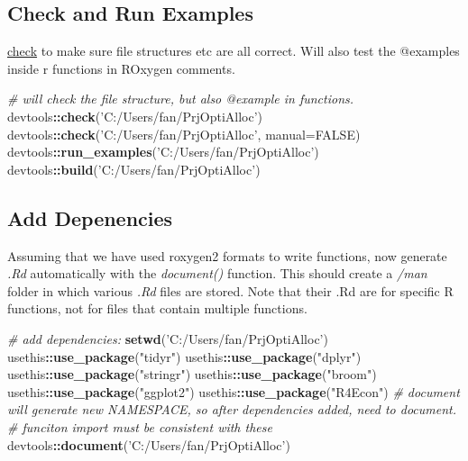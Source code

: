 \documentclass[
]{article}
\newenvironment{Shaded}{\begin{snugshade}}{\end{snugshade}}
\newcommand{\CommentTok}[1]{\textcolor[rgb]{0.56,0.35,0.01}{\textit{#1}}}
\newcommand{\DataTypeTok}[1]{\textcolor[rgb]{0.13,0.29,0.53}{#1}}
\newcommand{\KeywordTok}[1]{\textcolor[rgb]{0.13,0.29,0.53}{\textbf{#1}}}
\newcommand{\NormalTok}[1]{#1}
\newcommand{\OperatorTok}[1]{\textcolor[rgb]{0.81,0.36,0.00}{\textbf{#1}}}
\newcommand{\OtherTok}[1]{\textcolor[rgb]{0.56,0.35,0.01}{#1}}
\newcommand{\StringTok}[1]{\textcolor[rgb]{0.31,0.60,0.02}{#1}}
\begin{document}
\hypertarget{check-and-run-examples}{%
\subsection{Check and Run Examples}\label{check-and-run-examples}}

\href{http://r-pkgs.had.co.nz/check.html}{check} to make sure file
structures etc are all correct. Will also test the @examples inside r
functions in ROxygen comments.

\begin{Shaded}
\begin{Highlighting}[]
\CommentTok{# will check the file structure, but also @example in functions.}
\NormalTok{devtools}\OperatorTok{::}\KeywordTok{check}\NormalTok{(}\StringTok{'C:/Users/fan/PrjOptiAlloc'}\NormalTok{)}
\NormalTok{devtools}\OperatorTok{::}\KeywordTok{check}\NormalTok{(}\StringTok{'C:/Users/fan/PrjOptiAlloc'}\NormalTok{, }\DataTypeTok{manual=}\OtherTok{FALSE}\NormalTok{)}
\NormalTok{devtools}\OperatorTok{::}\KeywordTok{run_examples}\NormalTok{(}\StringTok{'C:/Users/fan/PrjOptiAlloc'}\NormalTok{)}
\NormalTok{devtools}\OperatorTok{::}\KeywordTok{build}\NormalTok{(}\StringTok{'C:/Users/fan/PrjOptiAlloc'}\NormalTok{)}
\end{Highlighting}
\end{Shaded}

\hypertarget{add-depenencies}{%
\subsection{Add Depenencies}\label{add-depenencies}}

Assuming that we have used roxygen2 formats to write functions, now
generate \emph{.Rd} automatically with the \emph{document()} function.
This should create a \emph{/man} folder in which various \emph{.Rd}
files are stored. Note that their .Rd are for specific R functions, not
for files that contain multiple functions.

\begin{Shaded}
\begin{Highlighting}[]
\CommentTok{# add dependencies:}
\KeywordTok{setwd}\NormalTok{(}\StringTok{'C:/Users/fan/PrjOptiAlloc'}\NormalTok{)}
\NormalTok{usethis}\OperatorTok{::}\KeywordTok{use_package}\NormalTok{(}\StringTok{"tidyr"}\NormalTok{)}
\NormalTok{usethis}\OperatorTok{::}\KeywordTok{use_package}\NormalTok{(}\StringTok{"dplyr"}\NormalTok{)}
\NormalTok{usethis}\OperatorTok{::}\KeywordTok{use_package}\NormalTok{(}\StringTok{"stringr"}\NormalTok{)}
\NormalTok{usethis}\OperatorTok{::}\KeywordTok{use_package}\NormalTok{(}\StringTok{"broom"}\NormalTok{)}
\NormalTok{usethis}\OperatorTok{::}\KeywordTok{use_package}\NormalTok{(}\StringTok{"ggplot2"}\NormalTok{)}
\NormalTok{usethis}\OperatorTok{::}\KeywordTok{use_package}\NormalTok{(}\StringTok{"R4Econ"}\NormalTok{)}
\CommentTok{# document will generate new NAMESPACE, so after dependencies added, need to document.}
\CommentTok{# funciton import must be consistent with these}
\NormalTok{devtools}\OperatorTok{::}\KeywordTok{document}\NormalTok{(}\StringTok{'C:/Users/fan/PrjOptiAlloc'}\NormalTok{)}
\end{Highlighting}
\end{Shaded}
\end{document}
